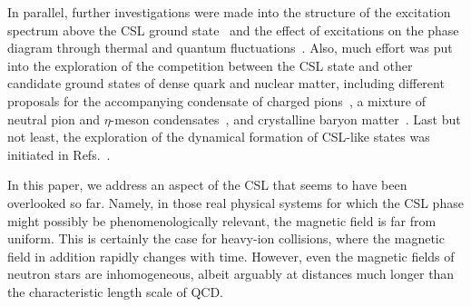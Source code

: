 \documentclass[pdflatex,iicol,sn-mathphys-num]{sn-jnl}
\providecommand{\DIFaddbegin}{} %
\begin{document}
In parallel, further investigations were made into the structure of the excitation spectrum above the CSL ground state~\cite{Yamamoto:2015maz,Ozaki:2016vwu,Brauner:2017mui} and the effect of excitations on the phase diagram through thermal and quantum fluctuations~\cite{Brauner:2021sci,Brauner:2023ort}. Also, much effort was put into the exploration of the competition between the CSL state and other candidate ground states of dense quark and nuclear matter, including different proposals for the accompanying condensate of charged pions~\cite{Evans:2022hwr,Eto:2025fkt,Eto:2023wul,Evans:2023hms}, a mixture of neutral pion and $\eta$-meson condensates~\cite{Qiu:2023guy}, and crystalline baryon matter~\cite{Chen:2021vou,Qiu:2024zpg,Amari:2025twm}. Last but not least, the exploration of the dynamical formation of CSL-like states was initiated in Refs.~\cite{Eto:2022lhu,Higaki:2022gnw,Nishimura:2023czx,Eto:2025ebz}.

In this paper, we address an aspect of the CSL that seems to have been overlooked so far. Namely, in those real physical systems for which the CSL phase might possibly be phenomenologically relevant, the magnetic field is far from uniform. This is certainly the case for heavy-ion collisions, where the magnetic field in addition rapidly changes with time. However, even the magnetic fields of neutron stars are inhomogeneous, albeit arguably at distances much longer than the characteristic length scale of QCD.
\DIFaddbegin 
\end{document}
